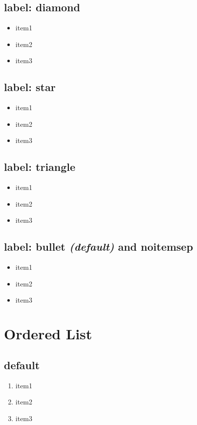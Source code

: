 \documentclass{article}
\begin{document}
	\subsection*{label: diamond }
	\begin{itemize}[label=$\diamond$]
		\item item1
		\item item2
		\item item3
	\end{itemize}

	\subsection*{label: star }
	\begin{itemize}[label=$\star$]
		\item item1
		\item item2
		\item item3
	\end{itemize}

	\subsection*{label: triangle }
	\begin{itemize}[label=$\triangleright$]
		\item item1
		\item item2
		\item item3
	\end{itemize}

	\subsection*{label: bullet \textit{(default)} and noitemsep }
	\begin{itemize}[label=$\bullet$,noitemsep]
		\item item1
		\item item2
		\item item3
	\end{itemize}
	\newpage

	\section*{Ordered List}

	\subsection*{default}
	\begin{enumerate} 
		\item item1
		\item item2
		\item item3
	\end{enumerate}
\end{document}
